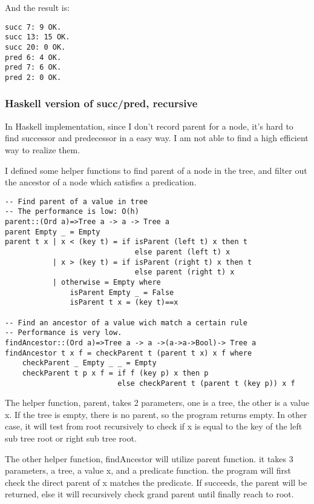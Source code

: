 \documentclass{article}
\begin{document}
And the result is:
\begin{verbatim}
succ 7: 9 OK.
succ 13: 15 OK.
succ 20: 0 OK.
pred 6: 4 OK.
pred 7: 6 OK.
pred 2: 0 OK.
\end{verbatim}

\subsubsection*{Haskell version of succ/pred, recursive}

In Haskell implementation, since I don't record parent for a node, it's hard
to find successor and predecessor in a easy way. I am not able to find a high
efficient way to realize them.

I defined some helper functions to find parent of a node in the tree, and filter
out the ancestor of a node which satisfies a predication. 

\lstset{language=Haskell}
\begin{lstlisting}
-- Find parent of a value in tree
-- The performance is low: O(h)
parent::(Ord a)=>Tree a -> a -> Tree a
parent Empty _ = Empty
parent t x | x < (key t) = if isParent (left t) x then t 
                              else parent (left t) x
           | x > (key t) = if isParent (right t) x then t 
                              else parent (right t) x
           | otherwise = Empty where
               isParent Empty _ = False
               isParent t x = (key t)==x

-- Find an ancestor of a value wich match a certain rule
-- Performance is very low.
findAncestor::(Ord a)=>Tree a -> a ->(a->a->Bool)-> Tree a
findAncestor t x f = checkParent t (parent t x) x f where
    checkParent _ Empty _ _ = Empty
    checkParent t p x f = if f (key p) x then p
                          else checkParent t (parent t (key p)) x f
\end{lstlisting}

The helper function, parent, takes 2 parameters, one is a tree, the other
is a value x. If the tree is empty, there is no parent, so the program returns
empty. In other case, it will test from root recursively to check if x is equal to
the key of the left sub tree root or right sub tree root.

The other helper function, findAncestor will utilize parent function. it takes 3
parameters, a tree, a value x, and a predicate function. the program will first 
check the direct parent of x matches the predicate. If succeeds, the parent will
be returned, else it will recursively check grand parent until finally reach to root.
\end{document}
